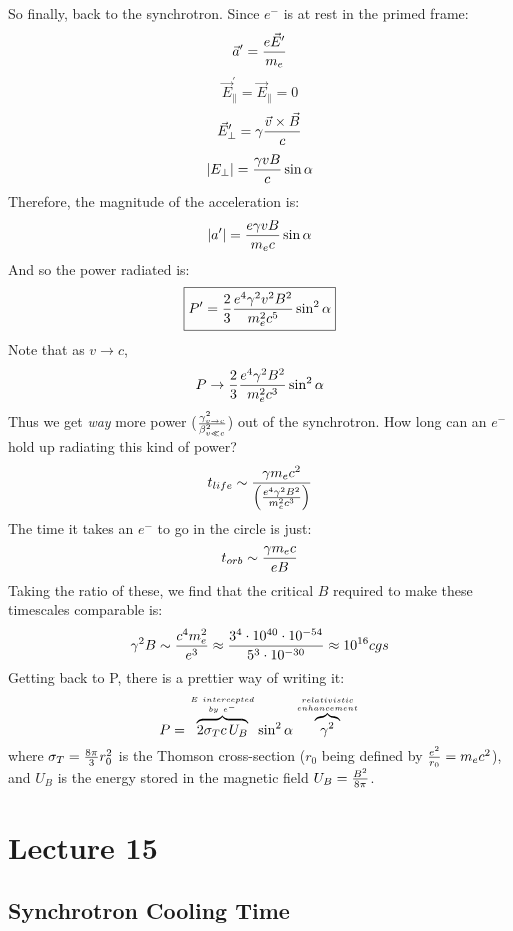 \documentclass[11pt]{article}
\def\ef{\vec E}
\def\bfield{{\vec B}}
\def\e#1{\cdot10^{#1}}
\begin{document}
So finally, back to the synchrotron.  Since $e^-$ is at rest in the primed
frame:
$$\vec a^\prime={e\ef^\prime\over m_e}$$
$$\ef_\|^\prime=\ef_\|=0$$
$$\ef_\perp^\prime=\gamma{\vec v\times\bfield\over c}$$
$$|E_\perp|={\gamma vB\over c}\sin\alpha$$
Therefore, the magnitude of the acceleration is:
$$|a^\prime|={e\gamma vB\over m_ec}\sin\alpha$$
And so the power radiated is:
$$\boxed{P^\prime={2\over3}{e^4\gamma^2v^2B^2\over m_e^2c^5}\sin^2\alpha}$$
Note that as $v\to c$,
$$P\to{2\over3}{e^4\gamma^2B^2\over m_e^2c^3}\sin^2\alpha$$
Thus we get {\it way} more power ($\gamma_{v\to c}^2\over\beta_{v\ll c}^2$) 
out of the synchrotron.  How long can an $e^-$ hold up radiating this kind
of power?
$$t_{life}\sim{\gamma m_ec^2\over\left({e^4\gamma^2B^2\over m_e^2c^3}\right)}$$
The time it takes an $e^-$ to go in the circle is just:
$$t_{orb}\sim{\gamma m_ec\over eB}$$
Taking the ratio of these, we find that the critical $B$ required to make
these timescales comparable is:
$$\gamma^2B\sim{c^4m_e^2\over e^3}\approx{3^4\e{40}\e{-54}\over
5^3\e{-30}}\approx10^{16}cgs$$
Getting back to P, there is a prettier way of writing it:
$$P=\overbrace{2\sigma_Tc\,U_B}^{E\ intercepted\atop by\ e^-}
\sin^2\alpha\overbrace{\gamma^2}^{relativistic\atop enhancement}$$
where $\sigma_T={8\pi\over3}r_0^2$ is the Thomson cross-section ($r_0$ being
defined by ${e^2\over r_0}=m_ec^2$), and $U_B$ is the energy stored in the
magnetic field $U_B={B^2\over8\pi}$.

\section*{ Lecture 15 }

\subsection*{ Synchrotron Cooling Time}
\end{document}
